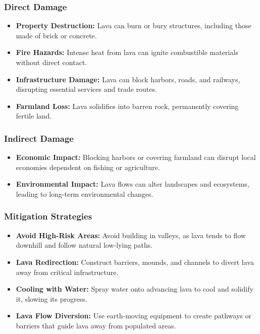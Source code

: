 \documentclass{article}
\begin{document}
\subsubsection{Direct Damage}
\begin{itemize}
    \item \textbf{Property Destruction:} Lava can burn or bury structures, including those made of brick or concrete.
    \item \textbf{Fire Hazards:} Intense heat from lava can ignite combustible materials without direct contact.
    \item \textbf{Infrastructure Damage:} Lava can block harbors, roads, and railways, disrupting essential services and trade routes.
    \item \textbf{Farmland Loss:} Lava solidifies into barren rock, permanently covering fertile land.
\end{itemize}

\subsubsection{Indirect Damage}
\begin{itemize}
    \item \textbf{Economic Impact:} Blocking harbors or covering farmland can disrupt local economies dependent on fishing or agriculture.
    \item \textbf{Environmental Impact:} Lava flows can alter landscapes and ecosystems, leading to long-term environmental changes.
\end{itemize}

\subsubsection{Mitigation Strategies}
\begin{itemize}
    \item \textbf{Avoid High-Risk Areas:} Avoid building in valleys, as lava tends to flow downhill and follow natural low-lying paths.
    \item \textbf{Lava Redirection:} Construct barriers, mounds, and channels to divert lava away from critical infrastructure.
    \item \textbf{Cooling with Water:} Spray water onto advancing lava to cool and solidify it, slowing its progress.
    \item \textbf{Lava Flow Diversion:} Use earth-moving equipment to create pathways or barriers that guide lava away from populated areas.
\end{itemize}
\end{document}
